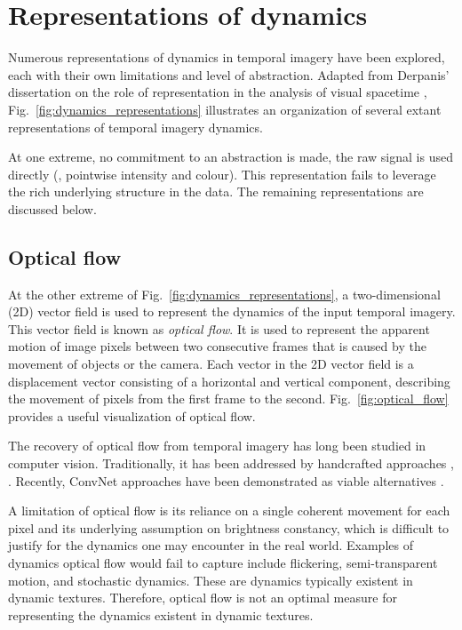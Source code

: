\section{Representations of dynamics}

Numerous representations of dynamics in temporal imagery have been explored, each with their own limitations and level of abstraction. Adapted from Derpanis' dissertation on the role of representation in the analysis of visual spacetime \cite{derpanis2010role}, Fig.\ \ref{fig:dynamics_representations} illustrates an organization of several extant representations of temporal imagery dynamics.

At one extreme, no commitment to an abstraction is made, the raw signal is used directly (\eg, pointwise intensity and colour). This representation fails to leverage the rich underlying structure in the data. The remaining representations are discussed below.

\subsection{Optical flow}

At the other extreme of Fig.\ \ref{fig:dynamics_representations}, a two-dimensional (2D) vector field is used to represent the dynamics of the input temporal imagery. This vector field is known as \emph{optical flow}. It is used to represent the apparent motion of image pixels between two consecutive frames that is caused by the movement of objects or the camera. Each vector in the 2D vector field is a displacement vector consisting of a horizontal and vertical component, describing the movement of pixels from the first frame to the second. Fig.\ \ref{fig:optical_flow} provides a useful visualization of optical flow.

The recovery of optical flow from temporal imagery has long been studied in computer vision. Traditionally, it has been addressed by handcrafted approaches \eg, \cite{horn1981,lucas1981,revaud2015epicflow}. Recently, ConvNet approaches have been demonstrated as viable alternatives \cite{dosovitskiy2015,ilg2017,ranjan2017,yu2016}.

A limitation of optical flow is its reliance on a single coherent movement for each pixel and its underlying assumption on brightness constancy, which is difficult to justify for the dynamics one may encounter in the real world. Examples of dynamics optical flow would fail to capture include flickering, semi-transparent motion, and stochastic dynamics. These are dynamics typically existent in dynamic textures. Therefore, optical flow is not an optimal measure for representing the dynamics existent in dynamic textures.

